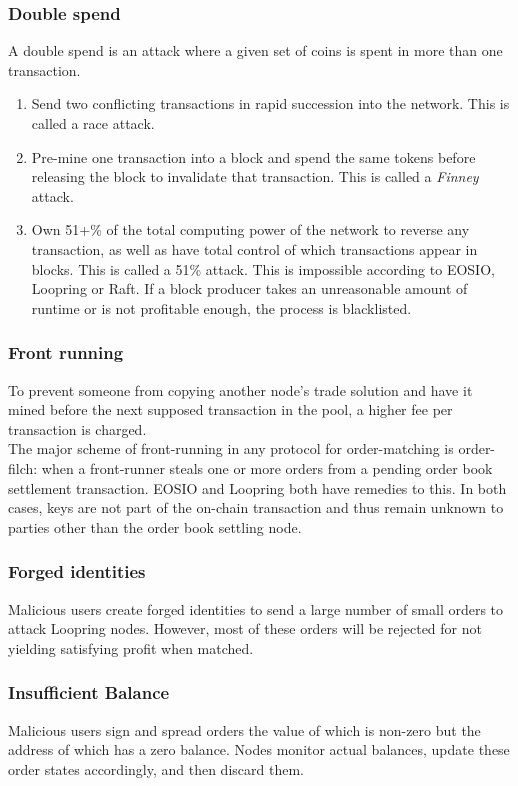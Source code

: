 \documentclass[]{article}
\begin{document}
{\subsubsection{Double spend}
A double spend is an attack where a given set of coins is spent in more than one transaction.
\begin{enumerate}
	\item Send two conflicting transactions in rapid succession into the network. This is called a race attack. 
	\item Pre-mine one transaction into a block and spend the same tokens before releasing the block to invalidate that transaction. 
	This is called a \textit{Finney} attack.
	\item Own 51+\% of the total computing power of the network to reverse any transaction, 
	as well as have total control of which transactions appear in blocks. 
	This is called a 51\% attack.
	This is impossible according to EOSIO, Loopring or Raft.
	If a block producer takes an unreasonable amount of runtime or is not profitable enough, the process is blacklisted.\cite{7}
\end{enumerate} 

\subsubsection{Front running}
To prevent someone from copying another node's trade solution 
and have it mined before the next supposed transaction in the pool, 
a higher fee per transaction is charged.\\ 
The major scheme of front-running in any protocol for
order-matching is order-filch: when a front-runner steals
one or more orders from a pending order book settlement
transaction. EOSIO and Loopring both have remedies to this.
In both cases, keys are not part of the on-chain transaction and thus remain unknown to parties other than the order book settling node.


\subsubsection{Forged identities}
Malicious users create forged identities to send a large number of small orders to attack Loopring nodes. However, most of these orders will be rejected for not yielding satisfying profit when matched. 

\subsubsection{Insufficient Balance}
Malicious users sign and spread orders the value of which is non-zero but the address of which has a zero balance. Nodes monitor actual balances, update these order states accordingly, and then discard them. 


}
\end{document}
